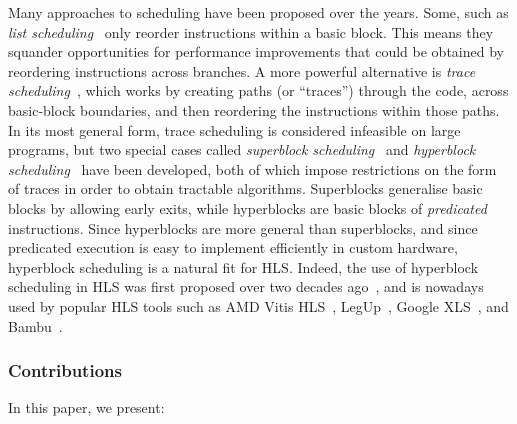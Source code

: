 \noindent Many approaches to scheduling have been proposed over the years. Some,
such as \emph{list scheduling}~\cite[][p.257]{baker19_princ} only reorder
instructions within a basic block. This means they squander opportunities for
performance improvements that could be obtained by reordering instructions
across branches. A more powerful alternative is \emph{trace
  scheduling}~\cite{ellis85_bulld, fisher81_trace_sched}, which works by
creating paths (or \enquote{traces}) through the code, across basic-block
boundaries, and then reordering the instructions within those paths. In its most
general form, trace scheduling is considered infeasible on large programs, but
two special cases called \emph{superblock scheduling}~\cite{hwu93_super} and
\emph{hyperblock
  scheduling}~\cite{mahlke92_effec_compil_suppor_predic_execut_using_hyper} have
been developed, both of which impose restrictions on the form of traces in order
to obtain tractable algorithms. Superblocks generalise basic blocks by allowing
early exits, while hyperblocks are basic blocks of \emph{predicated}
instructions. Since hyperblocks are more general than superblocks, and since
predicated execution is easy to implement efficiently in custom hardware,
hyperblock scheduling is a natural fit for HLS. Indeed, the use of hyperblock
scheduling in HLS was first proposed over two decades
ago~\cite{budiu02_compil_applic_specif_hardw,
  callahan98_instr_level_paral_recon_comput}, and is nowadays used by popular
HLS tools such as AMD Vitis HLS~\cite{amd23_vitis_forum},
LegUp~\cite[][p.60]{canis15_legup}, Google XLS~\cite[line~112]{google23_xls},
and Bambu~\cite[line~304]{ferrandi14_panda_bambu}.


\subsubsection*{Contributions}

In this paper, we present:

